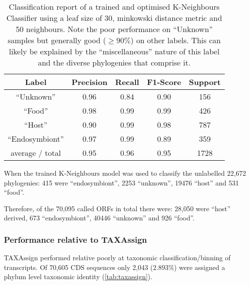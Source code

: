 \begin{table}
    \centering
	\begin{tabular}{|c|c|c|c|c|}
		\hline
		\textbf{Label} & \textbf{Precision} & \textbf{Recall} & \textbf{F1-Score} & \textbf{Support} \\
		\hline
		``Unknown'' & 0.96 & 0.84 & 0.90 & 156 \\
		``Food'' & 0.98 & 0.99 & 0.99 & 426 \\
		``Host'' & 0.90 & 0.99 & 0.98 & 787 \\
		``Endosymbiont'' &  0.97 & 0.99 & 0.89 & 359 \\
		\hline
		average / total & 0.95 & 0.96 & 0.95 & 1728 \\
		\hline 
	\end{tabular}
    \caption[Classification Report for K-Neighbours]{Classification report of a trained and optimised 
	K-Neighbours Classifier using a leaf size of 30, minkowski
	distance metric and 50 neighbours.  Note the poor performance
	on ``Unknown'' samples but generally good (\(\geq90\%\)) on
	other labels. This can likely be explained by the ``miscellaneous''
nature of this label and the diverse phylogenies that comprise it. }
\label{tab:classification_report}
\end{table} 

When the trained K-Neighbours model was used to classify 
the unlabelled 22,672 phylogenies: 415 were ``endosymbiont'',
2253 ``unknown'', 19476 ``host'' and 531 ``food''. 

Therefore, of the 70,095 called ORFs in total there were:
28,050 were ``host'' derived,  
673 ``endosymbiont'',  40446 ``unknown'' and 926 ``food''.

\subsubsection{Performance relative to TAXAssign}

TAXAssign performed relative poorly at taxonomic classification/binning
of transcripts.  Of 70,605 CDS sequences only
2,043 (\(2.893\%\)) were assigned a phylum level taxonomic identity (\cref{tab:taxassign}).

